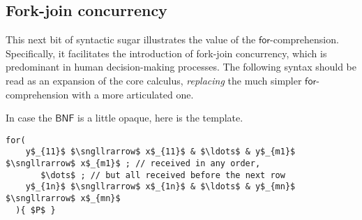 \subsection{Fork-join concurrency}

This next bit of syntactic sugar illustrates the value of the
$\mathsf{for}$-comprehension. Specifically, it facilitates the
introduction of fork-join concurrency, which is predominant in human
decision-making processes. The following syntax should be read as an
expansion of the core calculus, \emph{replacing} the much simpler
$\mathsf{for}$-comprehension with a more articulated one.


In case the $\mathsf{BNF}$ is a little opaque, here is the template.

\begin{lstlisting}[mathescape=true]
  for(
    y$_{11}$ $\sngllrarrow$ x$_{11}$ & $\ldots$ & y$_{m1}$ $\sngllrarrow$ x$_{m1}$ ; // received in any order, 
       $\dots$ ; // but all received before the next row
    y$_{1n}$ $\sngllrarrow$ x$_{1n}$ & $\ldots$ & y$_{mn}$ $\sngllrarrow$ x$_{mn}$
  ){ $P$ }
\end{lstlisting}
